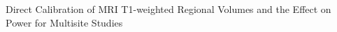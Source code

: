 Direct Calibration of MRI T1-weighted Regional Volumes and the Effect on Power for Multisite Studies